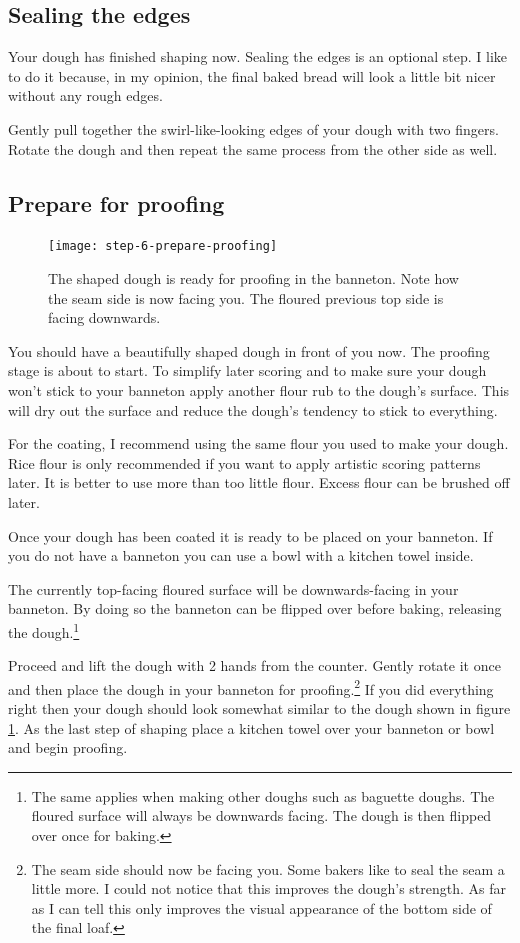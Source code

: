 \subsection[Sealing]{Sealing the edges}

Your dough has finished shaping now. Sealing the edges
is an optional step. I like to do it because, in my opinion,
the final baked bread will look a little bit nicer without
any rough edges.

Gently pull together the swirl-like-looking edges of your dough
with two fingers. Rotate the dough and then repeat the same process
from the other side as well.

\subsection[Proofing preparation]{Prepare for proofing}

\begin{figure}[htb!]
  \texttt{[image: step-6-prepare-proofing]}
  \caption{The shaped dough is ready for proofing in the banneton. Note how the seam side
  is now facing you. The floured previous top side is facing downwards.}
  \label{fig:shaping-prepare-proofing}
\end{figure}

You should have a beautifully shaped dough in front of you now.
The proofing stage is about to start. To simplify later
scoring and to make sure your dough won't stick to your banneton
apply another flour rub to the dough's surface. This
will dry out the surface and reduce the dough's tendency
to stick to everything.

For the coating, I recommend using the same flour you used
to make your dough. Rice flour is only recommended if you
want to apply artistic scoring patterns later. It is better
to use more than too little flour. Excess flour can be
brushed off later.

Once your dough has been coated it is ready to be placed on your banneton.
If you do not have a banneton you can use a bowl
with a kitchen towel inside.

The currently top-facing floured surface will be downwards-facing in your banneton.
By doing so the banneton can be flipped
over before baking, releasing the dough.\footnote{The same
applies when making other doughs such as baguette doughs. The floured
surface will always be downwards facing. The dough is then flipped over
once for baking.}

Proceed and lift the dough with 2 hands from the counter.
Gently rotate it once and then place the dough in your
banneton for proofing.\footnote{The seam side should now be facing you.
Some bakers like to seal the seam a little more. I could
not notice that this improves the dough's strength. As far as I can
tell this only improves the visual appearance of the bottom side
of the final loaf.} If you did everything right then your
dough should look somewhat similar to the dough shown in figure \ref{fig:shaping-prepare-proofing}.
As the last step of shaping place a kitchen towel over your banneton
or bowl and begin proofing.

